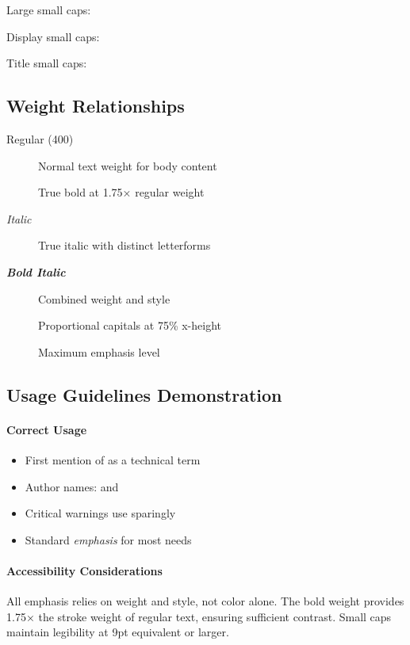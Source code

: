 \documentclass[11pt,a4paper]{article}
\begin{document}
{\large Large small caps: }

{\Large Display small caps: }

{\LARGE Title small caps: }

\subsection{Weight Relationships}

\begin{description}
\item[Regular (400)] Normal text weight for body content
\item[] True bold at 1.75× regular weight
\item[\emph{Italic}] True italic with distinct letterforms
\item[\textbf{\emph{Bold Italic}}] Combined weight and style
\item[] Proportional capitals at 75\% x-height
\item[] Maximum emphasis level
\end{description}

\subsection{Usage Guidelines Demonstration}

\paragraph{Correct Usage}
\begin{itemize}
\item First mention of  as a technical term
\item Author names:  and 
\item Critical warnings use  sparingly
\item Standard \emph{emphasis} for most needs
\end{itemize}

\paragraph{Accessibility Considerations}
All emphasis relies on weight and style, not color alone. The bold weight provides 1.75× the stroke weight of regular text, ensuring sufficient contrast. Small caps maintain legibility at 9pt equivalent or larger.
\end{document}
